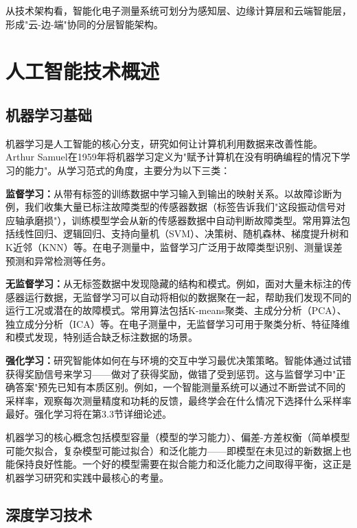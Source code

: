 \documentclass[12pt,a4paper]{article}
\numberwithin{figure}{section}
\numberwithin{table}{section}
\numberwithin{equation}{section}
\begin{document}
从技术架构看，智能化电子测量系统可划分为感知层、边缘计算层和云端智能层，形成"云-边-端"协同的分层智能架构。

\newpage

\section{人工智能技术概述}

\subsection{机器学习基础}

机器学习是人工智能的核心分支，研究如何让计算机利用数据来改善性能。Arthur Samuel在1959年将机器学习定义为"赋予计算机在没有明确编程的情况下学习的能力"。从学习范式的角度，主要分为以下三类：

\textbf{监督学习：}从带有标签的训练数据中学习输入到输出的映射关系。以故障诊断为例，我们收集大量已标注故障类型的传感器数据（标签告诉我们"这段振动信号对应轴承磨损"），训练模型学会从新的传感器数据中自动判断故障类型。常用算法包括线性回归、逻辑回归、支持向量机（SVM）、决策树、随机森林、梯度提升树和K近邻（KNN）等。在电子测量中，监督学习广泛用于故障类型识别、测量误差预测和异常检测等任务。

\textbf{无监督学习：}从无标签数据中发现隐藏的结构和模式。例如，面对大量未标注的传感器运行数据，无监督学习可以自动将相似的数据聚在一起，帮助我们发现不同的运行工况或潜在的故障模式。常用算法包括K-means聚类、主成分分析（PCA）、独立成分分析（ICA）等。在电子测量中，无监督学习可用于聚类分析、特征降维和模式发现，特别适合缺乏标注数据的场景。

\textbf{强化学习：}研究智能体如何在与环境的交互中学习最优决策策略。智能体通过试错获得奖励信号来学习——做对了获得奖励，做错了受到惩罚。这与监督学习中"正确答案"预先已知有本质区别。例如，一个智能测量系统可以通过不断尝试不同的采样率，观察每次测量精度和功耗的反馈，最终学会在什么情况下选择什么采样率最好。强化学习将在第3.3节详细论述。

机器学习的核心概念包括模型容量（模型的学习能力）、偏差-方差权衡（简单模型可能欠拟合，复杂模型可能过拟合）和泛化能力——即模型在未见过的新数据上也能保持良好性能。一个好的模型需要在拟合能力和泛化能力之间取得平衡，这正是机器学习研究和实践中最核心的考量。

\subsection{深度学习技术}
\end{document}
